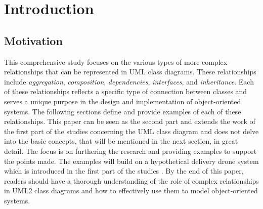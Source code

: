 \documentclass[
	12pt,
    a4paper,
    egregdoesnotlikesansseriftitles, %
    toc=chapterentrywithdots,
    oneside, openany,
    titlepage,
    parskip=half,
    headings=normal,  %
    listof=totoc,
    bibliography=totocnumbered,
    index=totoc,
    captions=tableheading,  %
    listof=flat,
    numbers=noenddot, %
    final]
    {scrbook}
\begin{document}
\setcounter{secnumdepth}{3}  %
\setcounter{tocdepth}{2}  %


\frontmatter


\tableofcontents

\listoffigures
\clearpage %

\listoftables
\clearpage %

\renewcommand{\lstlistlistingname}{List of Listings}  %
\clearpage %

\mainmatter

\chapter{Introduction}


\section{Motivation}
This comprehensive study focuses on the various types of more complex relationships that can be represented in UML class diagrams. 
These relationships include \emph{aggregation}, \emph{composition}, \emph{dependencies}, \emph{interfaces}, and \emph{inheritance}. 
Each of these relationships reflects a specific type of connection between classes and serves a unique purpose in the design and implementation of object-oriented systems. 
The following sections define and provide examples of each of these relationships.
This paper can be seen as the second part and extends the work of the first part of the studies concerning the UML class diagram \cite{levin} and does not delve into the basic concepts, that will be mentioned in the next section, in great detail. 
The focus is on furthering the research and providing examples to support the points made.
The examples will build on a hypothetical delivery drone system which is introduced in the first part of the studies \cite{levin} .
By the end of this paper, readers should have a thorough understanding of the role of complex relationships in UML2 class diagrams and how to effectively use them to model object-oriented systems.

\end{document}
